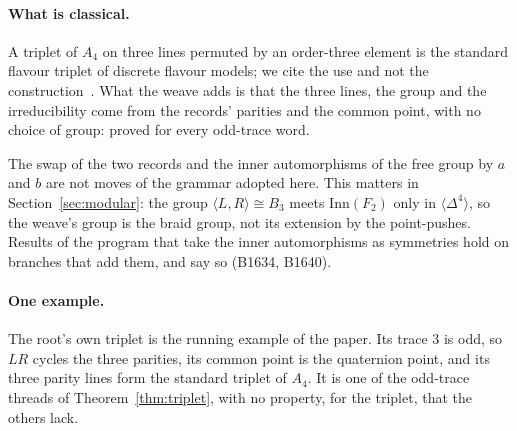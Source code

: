 \paragraph{What is classical.}
A triplet of $A_4$ on three lines permuted by an order-three element is the standard flavour triplet of discrete flavour
models; we cite the use and not the construction~\cite{MaRajasekaran2001,AltarelliFeruglio2005}. What the weave adds is that the three lines, the group and the
irreducibility come from the records' parities and the common point, with no choice of group: proved for every odd-trace
word.

\begin{remark}
The swap of the two records and the inner automorphisms of the free group by $a$ and $b$ are not moves of the
grammar adopted here. This matters in Section~\ref{sec:modular}: the group $\langle L,R\rangle\cong B_3$ meets
$\mathrm{Inn}(F_2)$ only in $\langle\Delta^4\rangle$, so the weave's group is the braid group, not its extension by the
point-pushes. Results of the program that take the inner automorphisms as symmetries hold on branches that add them, and
say so (B1634, B1640).
\end{remark}

\paragraph{One example.}
The root's own triplet is the running example of the paper. Its trace $3$ is odd, so $LR$ cycles the three parities, its
common point is the quaternion point, and its three parity lines form the standard triplet of $A_4$. It is one of the
odd-trace threads of Theorem~\ref{thm:triplet}, with no property, for the triplet, that the others lack.
